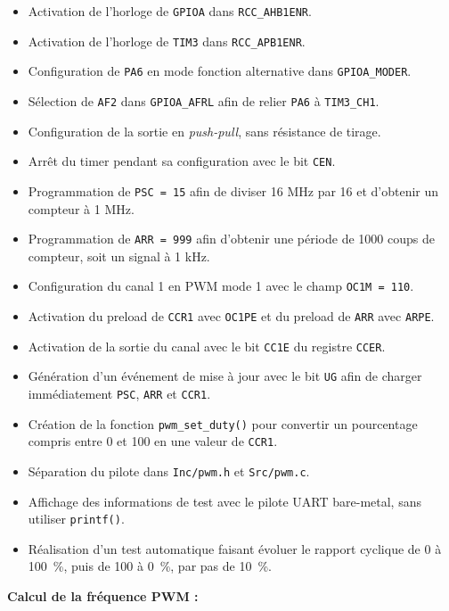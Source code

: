 \documentclass[11pt,a4paper]{article}
\begin{document}
\begin{sessionbox}
		\begin{itemize}
			\item Activation de l'horloge de \texttt{GPIOA} dans \texttt{RCC\_AHB1ENR}.
			\item Activation de l'horloge de \texttt{TIM3} dans \texttt{RCC\_APB1ENR}.
			\item Configuration de \texttt{PA6} en mode fonction alternative dans \texttt{GPIOA\_MODER}.
			\item Sélection de \texttt{AF2} dans \texttt{GPIOA\_AFRL} afin de relier \texttt{PA6} à \texttt{TIM3\_CH1}.
			\item Configuration de la sortie en \textit{push-pull}, sans résistance de tirage.
			\item Arrêt du timer pendant sa configuration avec le bit \texttt{CEN}.
			\item Programmation de \texttt{PSC = 15} afin de diviser 16 MHz par 16 et d'obtenir un compteur à 1 MHz.
			\item Programmation de \texttt{ARR = 999} afin d'obtenir une période de 1000 coups de compteur, soit un signal à 1 kHz.
			\item Configuration du canal 1 en PWM mode 1 avec le champ \texttt{OC1M = 110}.
			\item Activation du preload de \texttt{CCR1} avec \texttt{OC1PE} et du preload de \texttt{ARR} avec \texttt{ARPE}.
			\item Activation de la sortie du canal avec le bit \texttt{CC1E} du registre \texttt{CCER}.
			\item Génération d'un événement de mise à jour avec le bit \texttt{UG} afin de charger immédiatement \texttt{PSC}, \texttt{ARR} et \texttt{CCR1}.
			\item Création de la fonction \texttt{pwm\_set\_duty()} pour convertir un pourcentage compris entre 0 et 100 en une valeur de \texttt{CCR1}.
			\item Séparation du pilote dans \texttt{Inc/pwm.h} et \texttt{Src/pwm.c}.
			\item Affichage des informations de test avec le pilote UART bare-metal, sans utiliser \texttt{printf()}.
			\item Réalisation d'un test automatique faisant évoluer le rapport cyclique de 0 à 100~\%, puis de 100 à 0~\%, par pas de 10~\%.
		\end{itemize}
		
		\vspace{0.3cm}
		
		\textbf{Calcul de la fréquence PWM :}
		

\end{sessionbox}
\end{document}
